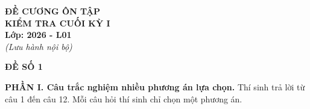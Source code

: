 \documentclass[12pt]{article}
\begin{document}
	
	\begin{titlepage}
		\centering
		\vspace*{4cm}
		
		{\Huge \textbf{ĐỀ CƯƠNG ÔN TẬP}}\\[1cm]
		{\LARGE \textbf{KIỂM TRA CUỐI KỲ I}}\\[1.5cm]
		
		{\Large \textbf{Lớp: 2026 - L01}}\\[0.5cm]
		
		{\large \textit{(Lưu hành nội bộ)}}
		
		\vfill
	\end{titlepage}
	
	\newpage
	\begin{center}
		{\LARGE \textbf{ĐỀ SỐ 1}}\\[4pt]
	\end{center}
	\vspace{4mm}
	
	\noindent\textbf{PHẦN I. Câu trắc nghiệm nhiều phương án lựa chọn.} Thí sinh trả lời từ câu 1 đến câu 12. Mỗi câu hỏi thí sinh chỉ chọn một phương án.
	\vspace{2mm}
	
\end{document}

